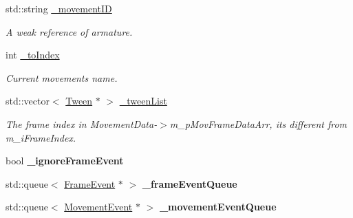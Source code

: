 \begin{DoxyCompactItemize}
std\+::string \hyperlink{classcocostudio_1_1ArmatureAnimation_a378e821226ac15429c6855e91f7cba7d}{\+\_\+movement\+ID}
\begin{DoxyCompactList}\small\item\em A weak reference of armature. \end{DoxyCompactList}\item 
\mbox{\label{classcocostudio_1_1ArmatureAnimation_a7ee31e0fd1b6fabd3ea43a030e119ef6}} 
int \hyperlink{classcocostudio_1_1ArmatureAnimation_a7ee31e0fd1b6fabd3ea43a030e119ef6}{\+\_\+to\+Index}
\begin{DoxyCompactList}\small\item\em Current movement\textquotesingle{}s name. \end{DoxyCompactList}\item 
\mbox{\label{classcocostudio_1_1ArmatureAnimation_a4de35c295ba2618538d2f821f69768eb}} 
std\+::vector$<$ \hyperlink{classcocostudio_1_1Tween}{Tween} $\ast$ $>$ \hyperlink{classcocostudio_1_1ArmatureAnimation_a4de35c295ba2618538d2f821f69768eb}{\+\_\+tween\+List}
\begin{DoxyCompactList}\small\item\em The frame index in Movement\+Data-\/$>$m\+\_\+p\+Mov\+Frame\+Data\+Arr, it\textquotesingle{}s different from m\+\_\+i\+Frame\+Index. \end{DoxyCompactList}\item 
\mbox{\label{classcocostudio_1_1ArmatureAnimation_abbca9687ca53cd42b2c6e11125ca3a1e}} 
bool {\bfseries \+\_\+ignore\+Frame\+Event}
\item 
\mbox{\label{classcocostudio_1_1ArmatureAnimation_aac475d3bcef9da07fe181eeba4acb3f7}} 
std\+::queue$<$ \hyperlink{structcocostudio_1_1FrameEvent}{Frame\+Event} $\ast$ $>$ {\bfseries \+\_\+frame\+Event\+Queue}
\item 
\mbox{\label{classcocostudio_1_1ArmatureAnimation_a3cda527e5c284996b38ce24594f4b70b}} 
std\+::queue$<$ \hyperlink{structcocostudio_1_1MovementEvent}{Movement\+Event} $\ast$ $>$ {\bfseries \+\_\+movement\+Event\+Queue}
\item 
\mbox{\label{classcocostudio_1_1ArmatureAnimation_a61722bb0f98e91d3fb6acab4055039cb}} 

\end{DoxyCompactItemize}
